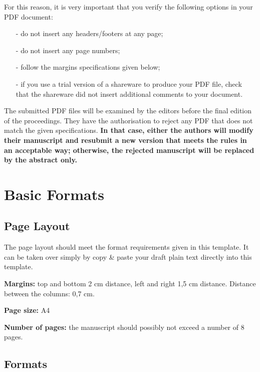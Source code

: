 \documentclass[a4paper, 10pt, twocolumn]{article}
\begin{document}
For this reason, it is very important that you verify the following options in your PDF document:
\begin{itemize}
	\item[-] do not insert any headers/footers at any page;
	\item[-] do not insert any page numbers;
	\item[-] follow the margins specifications given below;
	\item[-] if you use a trial version of a shareware to produce your PDF file, check that the shareware did not insert additional comments to your document.
\end{itemize}

The submitted PDF files will be examined by the editors before the final edition of the proceedings. They have the authorisation to reject any PDF that does not match the given specifications. \textbf{In that case, either the authors will modify their manuscript and resubmit a new version that meets the rules in an acceptable way; otherwise, the rejected manuscript will be replaced by the abstract only.}



\section{Basic Formats} \label{sec:BasicFormats}

\subsection{Page Layout}
The page layout should meet the format requirements given in this template. It can be taken over simply by copy \& paste your draft plain text directly into this template.

\textbf{Margins:} top and bottom 2 cm distance, left and right 1,5 cm distance. Distance between the columns: 0,7 cm.

\textbf{Page size:} A4

\textbf{Number of pages:} the manuscript should possibly not exceed a number of 8 pages.

\subsection{Formats} \label{sec:Formats}
\end{document}
